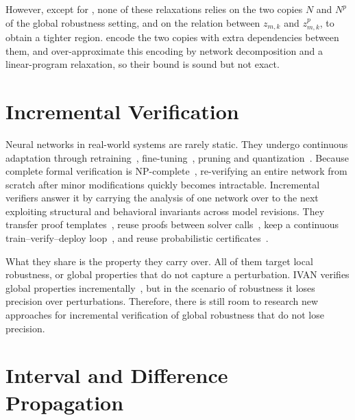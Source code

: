 However, except for \citet{wang2022}, none of these relaxations relies on the two copies $N$ and
$N^{p}$ of the global robustness setting, and on the relation between
$z_{m,k}$ and $z^{p}_{m,k}$, to obtain a tighter region.
\citet{wang2022} encode the two copies with extra dependencies between them, and over-approximate this encoding by network decomposition and a linear-program relaxation, so their bound is sound but not exact.


\section{Incremental Verification}
\label{sec:related-reuse}

Neural networks in real-world systems are rarely static.
They undergo continuous adaptation through
retraining~\citep{parisi2019}, fine-tuning~\citep{yosinski2014},
pruning and quantization~\citep{han2016deepcompression}. Because
complete formal verification is
NP-complete~\citep{katz2017reluplex},
re-verifying an entire network from scratch after minor modifications
quickly becomes intractable.
Incremental verifiers answer it by carrying the analysis of
one network over to the next exploiting structural and behavioral invariants
across model revisions. They transfer proof
templates~\citep{ugare2022fanc,fischer2022}, reuse proofs between
solver calls~\citep{yang2023deepinc}, keep a continuous
train--verify--deploy loop~\citep{ugare2023continuous}, and reuse
probabilistic certificates~\citep{ugare2024irs}.

What they share is the property they carry over. All of them target
local robustness, or global properties that do not capture a
perturbation. IVAN verifies global properties
incrementally~\citep{ugare2023}, but in the scenario of robustness it
loses precision over perturbations. Therefore, there is still room to
research new approaches for incremental verification of global robustness
that do not lose precision.

\section{Interval and Difference Propagation}
\label{sec:related-difference-propagation}

